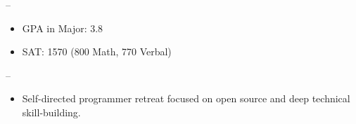 \textbf{} --  \
\textit{} \hfill \textit{} \
\begin{itemize}
\tightlist
\item
  GPA in Major: 3.8
\item
  SAT: 1570 (800 Math, 770 Verbal)
\end{itemize}
\vspace{\medskipamount}
\textbf{} --  \
\textit{} \hfill \textit{} \
\begin{itemize}
\tightlist
\item
  Self-directed programmer retreat focused on open source and deep technical skill-building.
\end{itemize}
\vspace{\medskipamount}
